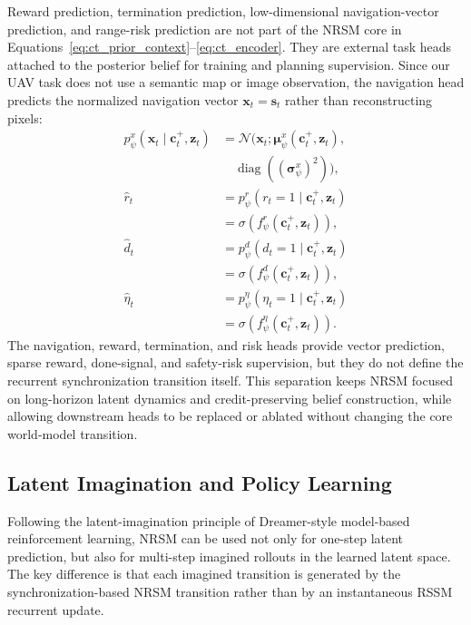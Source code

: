 \documentclass{article}
\begin{document}
Reward prediction, termination prediction, low-dimensional navigation-vector prediction, and range-risk prediction are not part of the NRSM core in Equations~\eqref{eq:ct_prior_context}--\eqref{eq:ct_encoder}. They are external task heads attached to the posterior belief for training and planning supervision. Since our UAV task does not use a semantic map or image observation, the navigation head predicts the normalized navigation vector $\mathbf x_t=\mathbf s_t$ rather than reconstructing pixels:
\begin{align}
p_{\psi}^{x}(\mathbf x_t\mid \mathbf c_t^+,\mathbf z_t)
&=
\mathcal N(
\mathbf x_t;
\boldsymbol{\mu}_{\psi}^{x}(\mathbf c_t^+,\mathbf z_t),
\nonumber\\
&\quad
\operatorname{diag}((\boldsymbol{\sigma}_{\psi}^{x})^2)),
\label{eq:external_decoder}\\
\hat r_t
&=
p_{\psi}^{r}(r_t=1\mid \mathbf c_t^+,\mathbf z_t)
\nonumber\\
&=
\sigma(f_{\psi}^{r}(\mathbf c_t^+,\mathbf z_t)),
\label{eq:external_reward}\\
\hat d_t
&=
p_{\psi}^{d}(d_t=1\mid \mathbf c_t^+,\mathbf z_t)
\nonumber\\
&=
\sigma(f_{\psi}^{d}(\mathbf c_t^+,\mathbf z_t)),
\label{eq:external_termination}\\
\hat\eta_t
&=
p_{\psi}^{\eta}(\eta_t=1\mid \mathbf c_t^+,\mathbf z_t)
\nonumber\\
&=
\sigma(f_{\psi}^{\eta}(\mathbf c_t^+,\mathbf z_t)).
\label{eq:external_range_risk}
\end{align}
The navigation, reward, termination, and risk heads provide vector prediction, sparse reward, done-signal, and safety-risk supervision, but they do not define the recurrent synchronization transition itself. This separation keeps NRSM focused on long-horizon latent dynamics and credit-preserving belief construction, while allowing downstream heads to be replaced or ablated without changing the core world-model transition.

\subsection{Latent Imagination and Policy Learning}

Following the latent-imagination principle of Dreamer-style model-based reinforcement learning, NRSM can be used not only for one-step latent prediction, but also for multi-step imagined rollouts in the learned latent space. The key difference is that each imagined transition is generated by the synchronization-based NRSM transition rather than by an instantaneous RSSM recurrent update.
\end{document}
